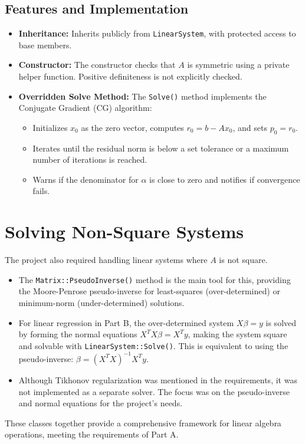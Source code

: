 \begin{figure}[H]

\end{figure}

\subsection{Features and Implementation}
\begin{sloppypar}
\begin{itemize}
    \item \textbf{Inheritance:} Inherits publicly from \texttt{LinearSystem}, with protected access to base members.
    \item \textbf{Constructor:} The constructor checks that $A$ is symmetric using a private helper function. Positive definiteness is not explicitly checked.
    \item \textbf{Overridden Solve Method:} The \texttt{Solve()} method implements the Conjugate Gradient (CG) algorithm:
        \begin{itemize}
            \item Initializes $x_0$ as the zero vector, computes $r_0 = b - Ax_0$, and sets $p_0 = r_0$.
            \item Iterates until the residual norm is below a set tolerance or a maximum number of iterations is reached.
            \item Warns if the denominator for $\alpha$ is close to zero and notifies if convergence fails.
        \end{itemize}
\end{itemize}
\end{sloppypar}

\section{Solving Non-Square Systems}
\label{sec:nonsquare_systems}
The project also required handling linear systems where $A$ is not square.
\begin{itemize}
    \item The \texttt{Matrix::PseudoInverse()} method is the main tool for this, providing the Moore-Penrose pseudo-inverse for least-squares (over-determined) or minimum-norm (under-determined) solutions.
    \item For linear regression in Part B, the over-determined system $X\beta = y$ is solved by forming the normal equations $X^T X \beta = X^T y$, making the system square and solvable with \texttt{LinearSystem::Solve()}. This is equivalent to using the pseudo-inverse: $\beta = (X^T X)^{-1} X^T y$.
    \item Although Tikhonov regularization was mentioned in the requirements, it was not implemented as a separate solver. The focus was on the pseudo-inverse and normal equations for the project’s needs.
\end{itemize}
These classes together provide a comprehensive framework for linear algebra operations, meeting the requirements of Part A.